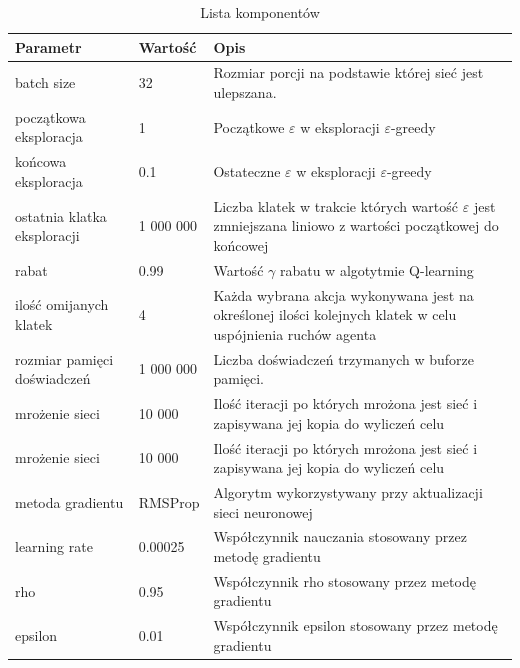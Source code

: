 \documentclass[12pt]{article}
\begin{document}
\begin{center}

\begin{table}[H]
  \centering%
  \caption{Lista komponentów}
\begin{tabular}{|p{3cm}|p{3cm}|p{10cm}|}
\hline
\textbf{Parametr} & \textbf{Wartość} & \textbf{Opis} \\
\hline

batch size &
32 & 
Rozmiar porcji na podstawie której sieć jest ulepszana. \\
\hline

początkowa eksploracja &
1 &
Początkowe $\varepsilon$ w eksploracji $\varepsilon$-greedy \\
\hline

końcowa eksploracja &
0.1 &
Ostateczne $\varepsilon$ w eksploracji $\varepsilon$-greedy \\
\hline

ostatnia klatka eksploracji &
1 000 000 &
Liczba klatek w trakcie których wartość $\varepsilon$ jest zmniejszana liniowo z wartości początkowej do końcowej\\
\hline

rabat &
0.99 &
Wartość $\gamma$ rabatu w algotytmie Q-learning\\
\hline

ilość omijanych klatek &
4 &
Każda wybrana akcja wykonywana jest na określonej ilości kolejnych klatek w celu uspójnienia ruchów agenta \\
\hline

rozmiar pamięci doświadczeń &
1 000 000 &
Liczba doświadczeń trzymanych w buforze pamięci.
\\
\hline

mrożenie sieci &
10 000 &
Ilość iteracji po których mrożona jest sieć i zapisywana jej kopia do wyliczeń celu  \\
\hline

mrożenie sieci &
10 000 &
Ilość iteracji po których mrożona jest sieć i zapisywana jej kopia do wyliczeń celu  \\
\hline


metoda gradientu &
RMSProp &
Algorytm wykorzystywany przy aktualizacji sieci neuronowej  \\
\hline

learning rate &
0.00025 &
Współczynnik nauczania stosowany przez metodę gradientu  \\
\hline

rho &
0.95 &
Współczynnik rho stosowany przez metodę gradientu  \\
\hline

epsilon &
0.01&
Współczynnik epsilon stosowany przez metodę gradientu  \\
\hline

\end{tabular}
\end{table}
\end{center}
\end{document}
